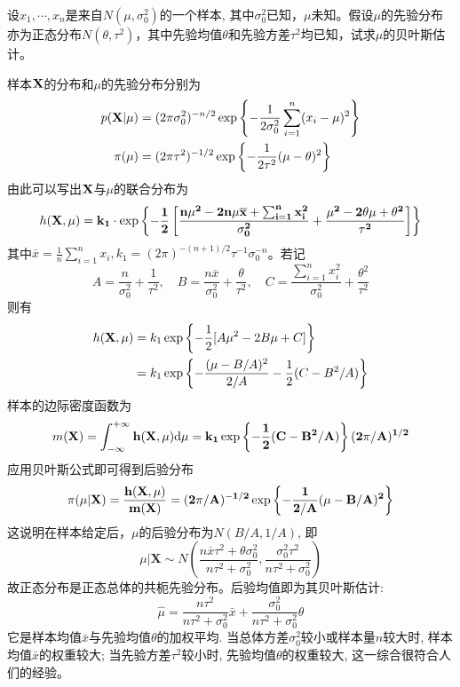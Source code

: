 \begin{example}
    设$x_1, \cdots, x_n$是来自$N(\mu, \sigma_0^2)$的一个样本, 其中$\sigma_0^2$已知，$\mu$未知。假设$\mu$的先验分布亦为正态分布$N(\theta, \tau^2)$，其中先验均值$\theta$和先验方差$\tau^2$均已知，试求$\mu$的贝叶斯估计。
\end{example}\begin{solution}
    样本$\bf X$的分布和$\mu$的先验分布分别为
    \begin{align*}
        p(\bf{X} | \mu) & = (2 \pi \sigma_0^2)^{-n/2} \exp \left\{-\frac1{2 \sigma_0^2} \sum_{i=1}^n (x_i-\mu)^2\right\} \\
        \pi(\mu)        & = (2 \pi \tau^2)^{-1/2} \exp \left\{-\frac1{2 \tau^2}(\mu-\theta)^2 \right\}
    \end{align*}
    由此可以写出$\bf X$与$\mu$的联合分布为
    \[ h(\bf{X}, \mu)=k_1 \cdot \exp \left\{-\frac12\left[\frac{n\mu^2 - 2n\mu \overline{x}+\sum_{i=1}^n  x_i^2}{\sigma_0^2}+\frac{\mu^2 - 2\theta \mu+\theta^2}{\tau^2}\right]\right\}\]
    其中$\overline{x}=\frac1n  \sum_{i=1}^n  x_i, k_1=(2 \pi)^{-(n+1)/2} \tau^{-1} \sigma_0^{-n}$。若记
    \[ A=\frac{n}{\sigma_0^2}+\frac1{\tau^2}, \quad B=\frac{n \overline{x}}{\sigma_0^2}+\frac{\theta}{\tau^2}, \quad C=\frac{\sum_{i=1}^n  x_i^2}{\sigma_0^2}+\frac{\theta^2}{\tau^2}\]
    则有
    \begin{align*}
        h(\bf{X}, \mu) & =k_1 \exp \left\{-\frac12[A \mu^2-2 B\mu+C] \right\}               \\
                       & =k_1 \exp \left\{-\frac{(\mu-B/A)^2}{2/A}-\frac12(C-B^2/A)\right\}
    \end{align*}
    样本的边际密度函数为
    \[ m(\bf{X})=\int_{-\infty}^{+\infty} h(\bf{X}, \mu) \mathrm{d}\mu=k_1 \exp \left\{-\frac12(C-B^2/A)\right\}(2 \pi/A)^{1/2} \]
    应用贝叶斯公式即可得到后验分布
    \[ \pi(\mu|\bf{X})=\frac{h(\bf{X}, \mu)}{m(\bf{X})}=(2 \pi/A)^{-1/2} \exp \left\{-\frac1{2/A}{(\mu-B/A)^2}\right\}\]
    这说明在样本给定后，$\mu$的后验分布为$N(B/A,1/A)$, 即
    \[ \mu | \mathbf{X} \sim N\left(\frac{n \overline{x} \tau^2 +\theta\sigma_0^2}{n\tau^2 +\sigma_0^2}, \frac{\sigma_0^2\tau^2}{n \tau^2 +\sigma_0^2}\right)\]
    故正态分布是正态总体的共枙先验分布。后验均值即为其贝叶斯估计:
    \[ \hat{\mu}=\frac{n\tau^2}{n\tau^2 +\sigma_0^2} \bar{x}+\frac{\sigma_0^2}{n\tau^2 +\sigma_0^2} \theta\]
    它是样本均值$\bar x$与先验均值$\theta$的加权平均. 当总体方差$\sigma_0^2$较小或样本量$n$较大时, 样本均值$\bar x$的权重较大; 当先验方差$\tau^2$较小时, 先验均值$\theta$的权重较大, 这一综合很符合人们的经验。
\end{solution}

